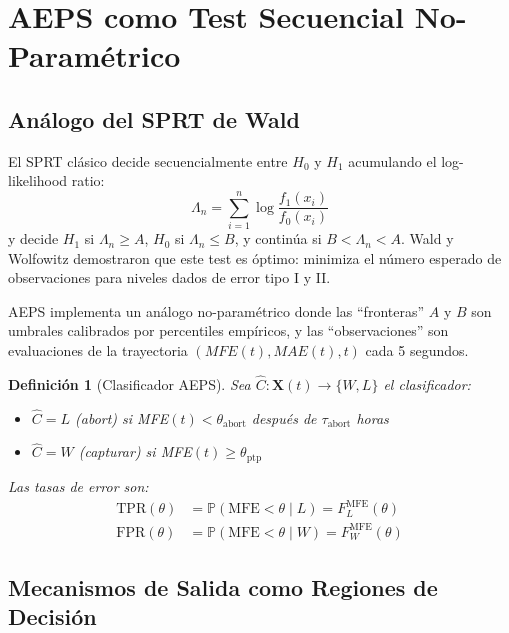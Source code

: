 \documentclass[11pt,a4paper]{article}
\newtheorem{definition}{Definici\'on}[section]
\newcommand{\Prob}{\mathbb{P}}
\begin{document}
\section{AEPS como Test Secuencial No-Param\'etrico}
\label{sec:sprt}

\subsection{An\'alogo del SPRT de Wald}

El SPRT cl\'asico \cite{wald1945sequential} decide secuencialmente
entre $H_0$ y $H_1$ acumulando el log-likelihood ratio:
\begin{equation}
\Lambda_n = \sum_{i=1}^{n} \log \frac{f_1(x_i)}{f_0(x_i)}
\end{equation}
y decide $H_1$ si $\Lambda_n \geq A$, $H_0$ si $\Lambda_n \leq B$,
y contin\'ua si $B < \Lambda_n < A$. Wald y Wolfowitz demostraron
que este test es \'optimo: minimiza el n\'umero esperado de
observaciones para niveles dados de error tipo I y II.

AEPS implementa un an\'alogo no-param\'etrico donde las ``fronteras''
$A$ y $B$ son umbrales calibrados por percentiles emp\'iricos, y
las ``observaciones'' son evaluaciones de la trayectoria
$(MFE(t), MAE(t), t)$ cada 5 segundos.

\begin{definition}[Clasificador AEPS]
Sea $\hat{C}: \bm{X}(t) \to \{W, L\}$ el clasificador:
\begin{itemize}[leftmargin=1.5em]
\item $\hat{C} = L$ (abort) si MFE$(t) < \theta_{\text{abort}}$
  despu\'es de $\tau_{\text{abort}}$ horas
\item $\hat{C} = W$ (capturar) si MFE$(t) \geq \theta_{\text{ptp}}$
\end{itemize}
Las tasas de error son:
\begin{align}
\text{TPR}(\theta) &= \Prob(\text{MFE} < \theta \mid L)
  = F_L^{\text{MFE}}(\theta) \\
\text{FPR}(\theta) &= \Prob(\text{MFE} < \theta \mid W)
  = F_W^{\text{MFE}}(\theta)
\end{align}
\end{definition}


\subsection{Mecanismos de Salida como Regiones de Decisi\'on}
\end{document}
